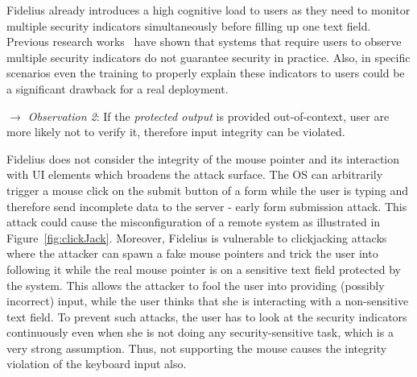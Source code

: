 Fidelius already introduces a high cognitive load to users as they need to monitor multiple security indicators simultaneously before filling up one text field. Previous research works~\cite{egelman2008you,sobey2008exploring, anderson2016warning} have shown that systems that require users to observe multiple security indicators %
do not guarantee security in practice.
Also, in specific scenarios even the training to properly explain these indicators to users could be a significant drawback for a real deployment.

\noindent\emph{$\rightarrow$ Observation 2}: If the \emph{protected output} is provided out-of-context, user are more likely not to verify it, therefore input integrity can be violated.

 

Fidelius does not consider the integrity of the mouse pointer and its interaction with UI elements which broadens the attack surface. The OS can arbitrarily trigger a mouse click on the submit button of a form while the user is typing and therefore send incomplete data to the server - early form submission attack.
This attack could cause the misconfiguration of a remote system as illustrated in Figure~\ref{fig:clickJack}.
Moreover, Fidelius is vulnerable to clickjacking attacks where the attacker can spawn a fake mouse pointers and trick the user into following it while the real mouse pointer is on a sensitive text field protected by the system. This allows the attacker to fool the user into providing (possibly incorrect) input, while the user thinks that she is interacting with a non-sensitive text field. To prevent such attacks, the user has to look at the security indicators continuously even when she is not doing any security-sensitive task, which is a very strong assumption. 
Thus, not supporting the mouse causes the integrity violation of the keyboard input also.


